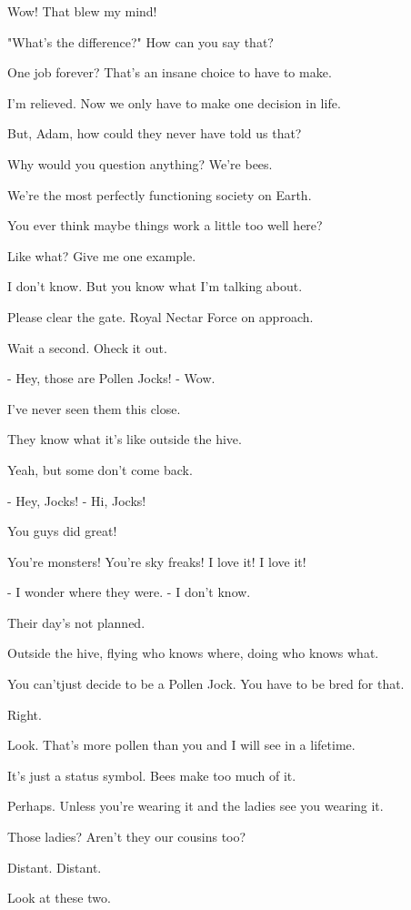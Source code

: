 \documentclass[journal]{IEEEtran}
\begin{document}
  
Wow! That blew my mind!

  
"What's the difference?"
How can you say that?

  
One job forever?
That's an insane choice to have to make.

  
I'm relieved. Now we only have
to make one decision in life.

  
But, Adam, how could they
never have told us that?

  
Why would you question anything?
We're bees.

  
We're the most perfectly
functioning society on Earth.

  
You ever think maybe things
work a little too well here?

  
Like what? Give me one example.

  
I don't know. But you know
what I'm talking about.

  
Please clear the gate.
Royal Nectar Force on approach.

  
Wait a second. Oheck it out.

  
- Hey, those are Pollen Jocks!
- Wow.

  
I've never seen them this close.

  
They know what it's like
outside the hive.

  
Yeah, but some don't come back.

  
- Hey, Jocks!
- Hi, Jocks!

  
You guys did great!

  
You're monsters!
You're sky freaks! I love it! I love it!

  
- I wonder where they were.
- I don't know.

  
Their day's not planned.

  
Outside the hive, flying who knows
where, doing who knows what.

  
You can'tjust decide to be a Pollen
Jock. You have to be bred for that.

  
Right.

  
Look. That's more pollen
than you and I will see in a lifetime.

  
It's just a status symbol.
Bees make too much of it.

  
Perhaps. Unless you're wearing it
and the ladies see you wearing it.

  
Those ladies?
Aren't they our cousins too?

  
Distant. Distant.

  
Look at these two.
\end{document}
